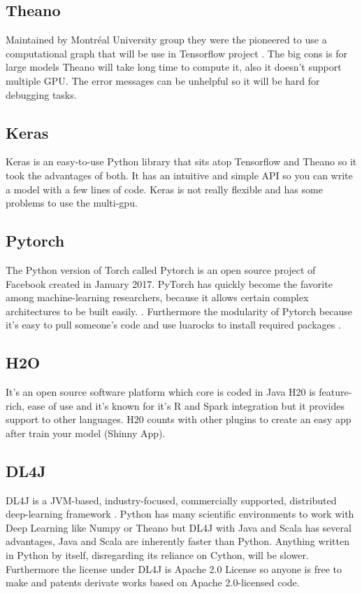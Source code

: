 \subsection[Theano]{Theano}
Maintained by Montréal University group \cite{specificcomparaison} they were the pioneered to use a computational graph that will be use in Tensorflow project \cite{generalcomparaison}. The big cons is for large models Theano will take long time to compute it, also it doesn't support multiple GPU. The error messages can be unhelpful so it will be hard for debugging tasks.

\subsection[Keras]{Keras}
Keras is an easy-to-use Python library \cite{specificcomparaison}
that sits atop Tensorflow and Theano so it took the advantages of both. It has an intuitive and simple API so you can write a model with a few lines of code. Keras is not really flexible and has some problems to use the multi-gpu. 

\subsection[Pytorch]{Pytorch}
The Python version of Torch called Pytorch is an open source project of Facebook created in January 2017. PyTorch has quickly become the favorite among machine-learning researchers, because it allows certain complex architectures to be built easily. \cite{generalcomparaison}. Furthermore the modularity of Pytorch because it's easy to pull someone's code and use  luarocks to install required packages \cite{specificcomparaison}. 

\subsection[H20]{H2O}
It's an open source software platform which core is coded in Java \cite{h20-deeplearning}
H20 is feature-rich, ease of use and it's known for it's R and Spark integration but it provides support to other languages. \cite{h20-comparative-table}
H20 counts with other plugins to create an easy app after train your model (Shinny App).
 
\subsection[DL4J]{DL4J}
DL4J is a JVM-based, industry-focused, commercially supported, distributed deep-learning framework \cite{generalcomparaison}. Python has many scientific environments to work with Deep Learning like Numpy or Theano but DL4J with Java and Scala has several advantages,
Java and Scala are inherently faster than Python. Anything written in Python by itself, disregarding its reliance on Cython, will be slower.
Furthermore the license under DL4J is Apache 2.0 License so anyone is free to make and patents derivate works based on Apache 2.0-licensed code. 

